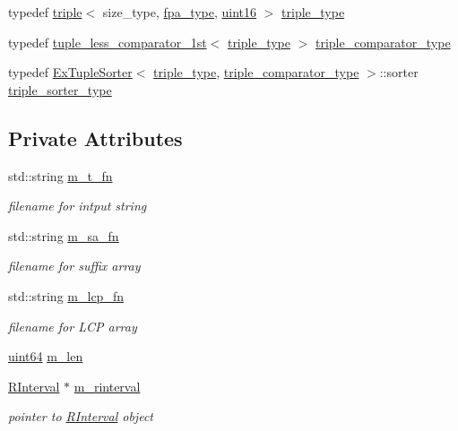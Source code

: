 \begin{DoxyCompactItemize}
typedef \hyperlink{structtriple}{triple}$<$ size\+\_\+type, \hyperlink{common_8h_a7fdaf8b9b3d2f6ae6b10597a8d3f96ee}{fpa\+\_\+type}, \hyperlink{types_8h_aea9840dd402bd5d5201bef4633398cb3}{uint16} $>$ \hyperlink{class_validate3_a5f4a1e8af5876ec1bef35bd0c3068203}{triple\+\_\+type}
\item 
typedef \hyperlink{structtuple__less__comparator__1st}{tuple\+\_\+less\+\_\+comparator\+\_\+1st}$<$ \hyperlink{class_validate3_a5f4a1e8af5876ec1bef35bd0c3068203}{triple\+\_\+type} $>$ \hyperlink{class_validate3_a35d0df8691519c4413a99d0e5739be54}{triple\+\_\+comparator\+\_\+type}
\item 
typedef \hyperlink{struct_ex_tuple_sorter}{Ex\+Tuple\+Sorter}$<$ \hyperlink{class_validate3_a5f4a1e8af5876ec1bef35bd0c3068203}{triple\+\_\+type}, \hyperlink{class_validate3_a35d0df8691519c4413a99d0e5739be54}{triple\+\_\+comparator\+\_\+type} $>$\+::sorter \hyperlink{class_validate3_ab3d4fd99ae8b2967f0b64b71a28efc66}{triple\+\_\+sorter\+\_\+type}
\end{DoxyCompactItemize}
\subsection*{Private Attributes}
\begin{DoxyCompactItemize}
\item 
std\+::string \hyperlink{class_validate3_a6f754bab729d30bd1d600bee9b68c4c4}{m\+\_\+t\+\_\+fn}
\begin{DoxyCompactList}\small\item\em filename for intput string \end{DoxyCompactList}\item 
std\+::string \hyperlink{class_validate3_a2be6f4b53d68e4cecb67f40d73aec102}{m\+\_\+sa\+\_\+fn}
\begin{DoxyCompactList}\small\item\em filename for suffix array \end{DoxyCompactList}\item 
std\+::string \hyperlink{class_validate3_a9a5b2ec4499a2ce49c2697e5bc36c953}{m\+\_\+lcp\+\_\+fn}
\begin{DoxyCompactList}\small\item\em filename for L\+CP array \end{DoxyCompactList}\item 
\hyperlink{types_8h_a60e8696a4678cd348e991a1f172e53f7}{uint64} \hyperlink{class_validate3_a20a6a7a05819b0830e92e78c13954921}{m\+\_\+len}
\item 
\hyperlink{struct_validate3_1_1_r_interval}{R\+Interval} $\ast$ \hyperlink{class_validate3_a70a0fb14cda49a88a90c2d426880adf0}{m\+\_\+rinterval}
\begin{DoxyCompactList}\small\item\em pointer to \hyperlink{struct_validate3_1_1_r_interval}{R\+Interval} object \end{DoxyCompactList}\end{DoxyCompactItemize}


